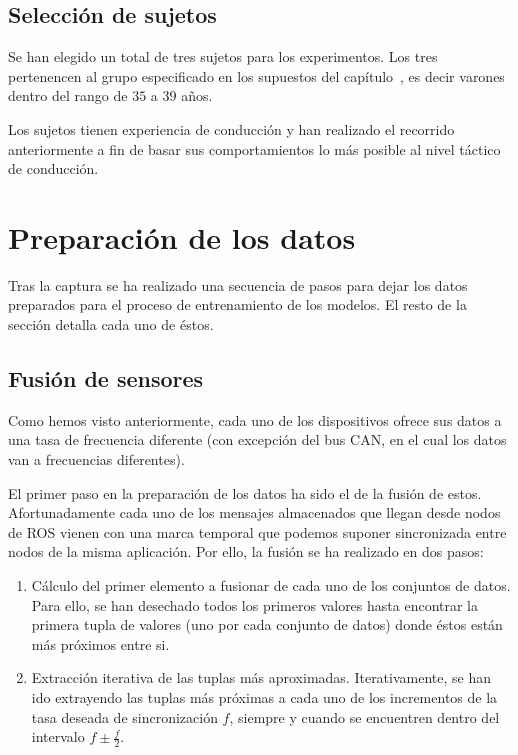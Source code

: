 \subsection{Selección de sujetos}

Se han elegido un total de tres sujetos para los experimentos. Los tres pertenencen al grupo especificado en los supuestos del capítulo~, es decir varones dentro del rango de $35$ a $39$ años.

Los sujetos tienen experiencia de conducción y han realizado el recorrido anteriormente a fin de basar sus comportamientos lo más posible al nivel táctico de conducción.


\section{Preparación de los datos}

Tras la captura se ha realizado una secuencia de pasos para dejar los datos preparados para el proceso de entrenamiento de los modelos. El resto de la sección detalla cada uno de éstos.

\subsection{Fusión de sensores}

Como hemos visto anteriormente, cada uno de los dispositivos ofrece sus datos a una tasa de frecuencia diferente (con excepción del bus CAN, en el cual los datos van a frecuencias diferentes).

El primer paso en la preparación de los datos ha sido el de la fusión de estos. Afortunadamente cada uno de los mensajes almacenados que llegan desde nodos de ROS vienen con una marca temporal que podemos suponer sincronizada entre nodos de la misma aplicación. Por ello, la fusión se ha realizado en dos pasos:

\begin{enumerate}
	\item Cálculo del primer elemento a fusionar de cada uno de los conjuntos de datos. Para ello, se han desechado todos los primeros valores hasta encontrar la primera tupla de valores (uno por cada conjunto de datos) donde éstos están más próximos entre si.
	\item Extracción iterativa de las tuplas más aproximadas. Iterativamente, se han ido extrayendo las tuplas más próximas a cada uno de los incrementos de la tasa deseada de sincronización $f$, siempre y cuando se encuentren dentro del intervalo $f \pm \frac{f}{2}$.
\end{enumerate}

